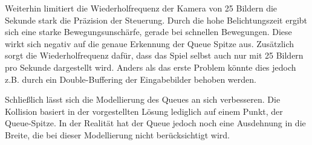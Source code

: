 Weiterhin limitiert die Wiederholfrequenz der Kamera von 25 Bildern die Sekunde stark die Präzision der Steuerung. 
Durch die hohe Belichtungszeit ergibt sich eine starke Bewegungsunschärfe, gerade bei schnellen Bewegungen. 
Diese wirkt sich negativ auf die genaue Erkennung der Queue Spitze aus.
Zusätzlich sorgt die Wiederholfrequenz dafür, dass das Spiel selbst auch nur mit 25 Bildern pro Sekunde dargestellt wird. 
Anders als das erste Problem könnte dies jedoch z.B. durch ein Double-Buffering der Eingabebilder behoben werden.

Schließlich lässt sich die Modellierung des Queues an sich verbesseren.
Die Kollision basiert in der vorgestellten Lösung lediglich auf einem Punkt, der Queue-Spitze.
In der Realität hat der Queue jedoch noch eine Ausdehnung in die Breite, die bei dieser Modellierung nicht berücksichtigt wird.